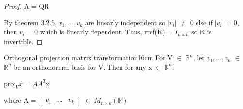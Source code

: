 \begin{proof}
        \hspace{0.5cm}
        A = QR

        By {\color{red} theorem 3.2.5}, $v_1,...,v_k$
        are linearly independent so $|v_i|$ $\not =$ 0
        else if $|v_i|$ = 0, then $v_i$ = 0 which is linearly dependent.
        Thus, rref(R) = $I_{n \times n}$ so R is invertible.
    \end{proof}

    \vspace{0.5cm}



    \begin{wtheorem}{Orthogonal projection matrix transformation}{16cm}
        For V $\in$ $\mathbb{R}^n$, let $v_1,...,v_k$ $\in$ $\mathbb{R}^n$
        be an orthonormal basis for V. Then for any x $\in$ $\mathbb{R}^n$:

        \hspace{0.5cm}
        $\text{proj}_Vx$ = $AA^T$x

        where A =
        $\begin{bmatrix}
            v_1 & ... & v_k
        \end{bmatrix}$
        $\in$ $M_{n \times k}(\mathbb{R})$
    \end{wtheorem}


